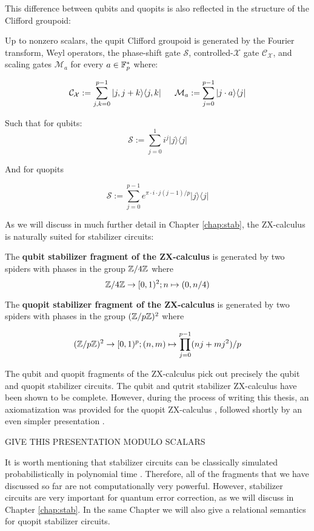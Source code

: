 This difference between qubits and quopits  is also reflected in the structure of the Clifford groupoid:

\begin{lemma}
Up to nonzero scalars, the qupit Clifford groupoid is generated by the Fourier transform, Weyl operators, the  phase-shift gate $\mathcal S$, controlled-$\mathcal X$ gate $\mathcal{C}_{\mathcal X}$, and scaling gates $\mathcal{M}_a$ for every $a \in \mathbb{F}_p^*$ where:


$$
\mathcal{C}_{\mathcal X}:= \sum_{j,k=0}^{p-1} |j,j+k \rangle \langle j,k |\, \hspace*{.5cm}
\mathcal{M}_a := \sum_{j=0}^{p-1} |j\cdot a \rangle\langle j |
$$ 

Such that for qubits:
$$
\mathcal{S}:= \sum_{j=0}^{1} i^j |j\rangle\langle j |
$$


And for quopits

$$
\mathcal{S}:= \sum_{j=0}^{p-1} e^{\pi\cdot i \cdot j(j-1)/p} |j\rangle\langle j |
$$
\end{lemma}


As we will discuss in much further detail in Chapter \ref{chap:stab}, the ZX-calculus is naturally suited for stabilizer circuits:

\begin{definition}
The {\bf qubit stabilizer fragment of the ZX-calculus} is generated by two spiders with phases in the group $\mathbb{Z}/4\mathbb{Z}$ where
$$
\mathbb{Z}/4\mathbb{Z} \to [0,1)^2; n \mapsto (0,n/4)
$$

The {\bf quopit stabilizer fragment of the ZX-calculus} is generated by two spiders with phases in the group $(\mathbb{Z}/p\mathbb{Z})^2$ where

$$
(\mathbb{Z}/p\mathbb{Z})^2 \to [0,1)^p; (n,m)\mapsto  \prod_{j=0}^{p-1} (n j +m j^2)/p 
$$
\end{definition}

The qubit and quopit fragments of the ZX-calculus pick out precisely the qubit and quopit stabilizer circuits.  The qubit \cite{backensstab,backens2015} and qutrit \cite{qutrit} stabilizer ZX-calculus have been shown to be complete.  However, during the process of writing this thesis, an axiomatization was provided for the quopit ZX-calculus \cite{booth}, followed shortly by an even simpler presentation \cite{poor}.

GIVE THIS PRESENTATION MODULO SCALARS

It is worth mentioning that stabilizer circuits can be classically simulated probabilistically in polynomial time \cite{gottesmanknill}.  Therefore, all of the fragments that we have discussed so far are not computationally very powerful.  However, stabilizer circuits are very important for quantum error correction, as we will discuss in Chapter \ref{chap:stab}.  In the same Chapter we will also give a relational semantics for quopit stabilizer circuits.

